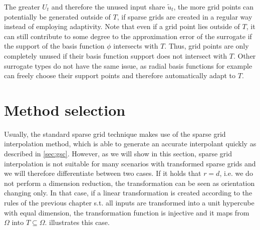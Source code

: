 \documentclass[
  a4paper,  %
  twoside,  %
  bibliography=totoc,
  headsepline,
  cleardoublepage=empty,
  parskip=half,
  draft=false
]{scrbook}
\begin{document}
The greater $U_t$ and therefore the unused input share $\tilde{u}_t$, the more grid points can potentially be generated outside of $T$, if sparse grids are created in a regular way instead of employing adaptivity.
Note that even if a grid point lies outside of $T$, it can still contribute to some degree to the approximation error of the surrogate if the support of the basis function $\phi$ intersects with $T$.
Thus, grid points are only completely unused if their basis function support does not intersect with $T$.
Other surrogate types do not have the same issue, as radial basis functions for example can freely choose their support points and therefore automatically adapt to $T$.

\section{Method selection}

Usually, the standard sparse grid technique makes use of the sparse grid interpolation method, which is able to generate an accurate interpolant quickly as described in \cref{sec:gsc}.
However, as we will show in this section, sparse grid interpolation is not suitable for many scenarios with transformed sparse grids and we will therefore differentiate between two cases.
If it holds that $r=d$, i.e. we do not perform a dimension reduction, the transformation can be seen as orientation changing only.
In that case, if a linear transformation is created according to the rules of the previous chapter s.t. all inputs are transformed into a unit hypercube with equal dimension, the transformation function is injective and it maps from $\Omega$ into $T \subseteq \Omega$.
 illustrates this case.
\end{document}
